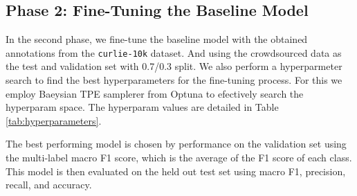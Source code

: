 \subsection* {Phase 2: Fine-Tuning the Baseline Model}
In the second phase, we fine-tune the baseline model with the obtained annotations from the \texttt{curlie-10k} dataset. And using the crowdsourced data as the test and validation set with 0.7/0.3 split.
We also perform a hyperparmeter search to find the best hyperparameters for the fine-tuning process. 
For this we employ Baeysian TPE samplerer from Optuna \cite{optuna} to efectively search the hyperparam space. 
The hyperparam values are detailed in Table \ref{tab:hyperparameters}.


The best performing model is chosen by performance on the validation set using the multi-label macro F1 score, which is the average of the F1 score of each class. 
This model is then evaluated on the held out test set using macro F1, precision, recall, and accuracy.


